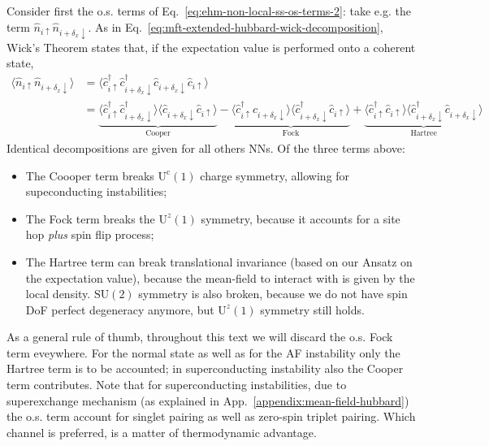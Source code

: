 Consider first the o.s. terms of Eq.~\eqref{eq:ehm-non-local-ss-os-terms-2}: take e.g. the term $\hat n_{i\uparrow} \hat n_{i + \delta_x \downarrow}$. As in Eq.~\eqref{eq:mft-extended-hubbard-wick-decomposition}, Wick's Theorem states that, if the expectation value is performed onto a coherent state,
\[
\begin{aligned}
	\langle 
	\hat n_{i\uparrow} \hat n_{i + \delta_x \downarrow}
	\rangle &= \langle 
	\hat c_{i\uparrow}^\dagger \hat c_{i + \delta_x \downarrow}^\dagger \hat c_{i + \delta_x \downarrow} \hat c_{i\uparrow} 
	\rangle \\
	&= 
	\underbrace{
		\langle 
		\hat c_{i\uparrow}^\dagger \hat c_{i + \delta_x \downarrow}^\dagger
		\rangle \langle	
		\hat c_{i + \delta_x \downarrow} \hat c_{i\uparrow} 
		\rangle 
	}_{\text{Cooper}}
	- 
	\underbrace{
		\langle 
		\hat c_{i\uparrow}^\dagger \hat c_{i + \delta_x \downarrow}
		\rangle \langle	
		\hat c_{i + \delta_x \downarrow}^\dagger \hat c_{i\uparrow} 
		\rangle 
	}_{\text{Fock}}
	+ 
	\underbrace{
		\langle 
		\hat c_{i\uparrow}^\dagger \hat c_{i\uparrow}
		\rangle \langle	
		\hat c_{i + \delta_x \downarrow}^\dagger \hat c_{i + \delta_x \downarrow} 
		\rangle
	}_{\text{Hartree}}
\end{aligned}
\]
Identical decompositions are given for all others NNs. Of the three terms above:
\begin{itemize}
	\item The Coooper term breaks $\mathrm{U}^\mathrm{c}(1)$ charge symmetry, allowing for supeconducting instabilities;
	\item The Fock term breaks the $\mathrm{U}^z(1)$ symmetry, because it accounts for a site hop \textit{plus} spin flip process;
	\item The Hartree term can break translational invariance (based on our Ansatz on the expectation value), because the mean-field to interact with is given by the local density. $\mathrm{SU}(2)$ symmetry is also broken, because we do not have spin DoF perfect degeneracy anymore, but $\mathrm{U}^z(1)$ symmetry still holds.
\end{itemize}
As a general rule of thumb, throughout this text we will discard the o.s. Fock term eveywhere. For the normal state as well as for the AF instability only the Hartree term is to be accounted; in superconducting instability also the Cooper term contributes. Note that for superconducting instabilities, due to superexchange mechanism (as explained in App.~\ref{appendix:mean-field-hubbard}) the o.s. term account for singlet pairing as well as zero-spin triplet pairing. Which channel is preferred, is a matter of thermodynamic advantage.

